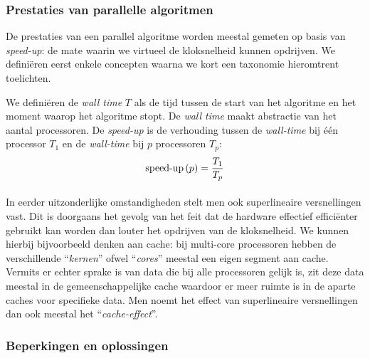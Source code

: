 \subsubsection{Prestaties van parallelle algoritmen}

De prestaties van een parallel algoritme worden meestal gemeten op basis van \emph{speed-up}: de mate waarin we virtueel de kloksnelheid kunnen opdrijven. We defini\"eren eerst enkele concepten waarna we kort een taxonomie hieromtrent toelichten.

\begin{definition}
We defini\"eren de \emph{wall time} $T$ als de tijd tussen de start van het algoritme en het moment waarop het algoritme stopt. De \emph{wall time} maakt abstractie van het aantal processoren. De \emph{speed-up} is de verhouding tussen de \emph{wall-time} bij \'e\'en processor $T_1$ en de \emph{wall-time} bij $p$ processoren $T_p$:
\begin{equation}
\mbox{speed-up}\left(p\right)=\displaystyle\frac{T_1}{T_p}
\end{equation}

\end{definition}

\paragraph{}

In eerder uitzonderlijke omstandigheden stelt men ook superlineaire versnellingen vast. Dit is doorgaans het gevolg van het feit dat de hardware effectief effici\"enter gebruikt kan worden dan louter het opdrijven van de kloksnelheid. We kunnen hierbij bijvoorbeeld denken aan cache: bij multi-core processoren hebben de verschillende ``\emph{kernen}'' ofwel ``\emph{cores}'' meestal een eigen segment aan cache. Vermits er echter sprake is van data 
die bij alle processoren gelijk is, zit deze data meestal in de gemeenschappelijke cache waardoor er meer ruimte is in de aparte caches voor specifieke data. Men noemt het effect van superlineaire versnellingen dan ook meestal het ``\emph{cache-effect}''\cite{cacheEffect}.

\subsubsection{Beperkingen en oplossingen}

